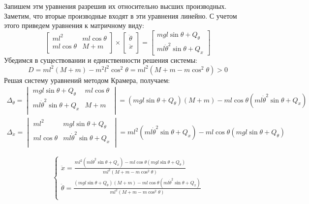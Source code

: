 Запишем этм уравнения разрешив их относительно высших производных. Заметим, что вторые производные 
входят в эти уравнения линейно. С учетом этого приведем уравнения к матричному виду:  %
\begin{equation}
    \begin{bmatrix}
        ml^2 & ml\cos\theta \\
        ml\cos\theta & M + m \\
    \end{bmatrix} \times
    \begin{bmatrix}
        \ddot{\theta} \\
        \ddot{x} \\
    \end{bmatrix} =
    \begin{bmatrix}
        mgl\sin\theta + Q_{\theta} \\
        ml\dot{\theta}^2\sin\theta + Q_x
    \end{bmatrix}
\end{equation}
Убедимся в существовании и единственности решения системы:
\begin{equation}
    D = ml^2(M + m) - m^2l^2\cos^2\theta = ml^2(M + m - m\cos^2\theta) > 0
\end{equation}
Решая систему уравнений методом Крамера, получаем:
\begin{multline}
    \Delta_{\ddot{\theta}} = \begin{vmatrix}
        mgl\sin\theta + Q_{\theta} & ml\cos\theta \\
        ml\dot{\theta}^2\sin\theta + Q_x & M + m \\
    \end{vmatrix} = (mgl\sin\theta + Q_{\theta})(M + m) - ml\cos\theta(ml\dot{\theta}^2\sin\theta + Q_x) 
\end{multline}
\begin{multline}
    \Delta_{\ddot{x}} = \begin{vmatrix}
        ml^2 & mgl\sin\theta + Q_{\theta} \\
        ml\cos\theta & ml\dot{\theta}^2\sin\theta + Q_x \\
    \end{vmatrix} = ml^2(ml\dot{\theta}^2\sin\theta + Q_x) - ml\cos\theta(mgl\sin\theta + Q_{\theta})
\end{multline}

\begin{equation}
    \begin{cases}
        \ddot{x} = \frac{ml^2(ml\dot{\theta}^2\sin\theta + Q_x) - ml\cos\theta(mgl\sin\theta + Q_{\theta})}{ml^2(M + m - m\cos^2\theta)} \\ 
        \ddot{\theta} = \frac{(mgl\sin\theta + Q_{\theta})(M + m) - ml\cos\theta(ml\dot{\theta}^2\sin\theta + Q_x)}{ml^2(M + m - m\cos^2\theta)} \\ 
    \end{cases}
    \label{eq:nonlinear_model}
\end{equation}


